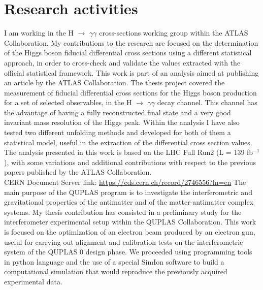 \documentclass[11pt,a4paper,roman]{moderncv}        %
\begin{document}
\section{Research activities}
{I am working in the H $\rightarrow$ $\gamma\gamma$ cross-sections working group within the ATLAS Collaboration. My contributions to the research are focused on the determination of the Higgs boson fiducial differential cross sections using a different statistical approach, in order to cross-check and validate the values extracted with the official statistical framework.
This work is part of an analysis aimed at publishing an article by the ATLAS Collaboration.}
{The thesis project covered the measurement of fiducial differential cross sections for the Higgs boson production for a set of selected observables, in the H $\rightarrow$  $\gamma\gamma$ decay channel. This channel has the advantage of having a fully reconstructed final state and a very good invariant mass resolution of the Higgs peak. Within the analysis I have also tested two different unfolding methods and developed for both of them a statistical model, useful in the extraction of the differential cross section values. The analysis presented in this work is based on the LHC Full Run2 (L = 139 fb$^{-1}$ ), with some variations and additional contributions with respect to the previous papers published by the ATLAS Collaboration. \\
CERN Document Server link: \url{https://cds.cern.ch/record/2746556?ln=en}}
{The main purpose of the QUPLAS program is to investigate the interferometric and gravitational properties of the antimatter and of the matter-antimatter complex systems. My thesis contribution has consisted in a preliminary study for the interferometer experimental setup within the QUPLAS Collaboration. This work is focused on the optimization of an electron beam produced by an electron gun, useful for carrying out alignment and calibration tests on the interferometric system of the QUPLAS 0 design phase. We proceeded using programming tools in python language and the use of a special SimIon software to build a computational simulation that would reproduce the previously acquired experimental data.}
\end{document}
